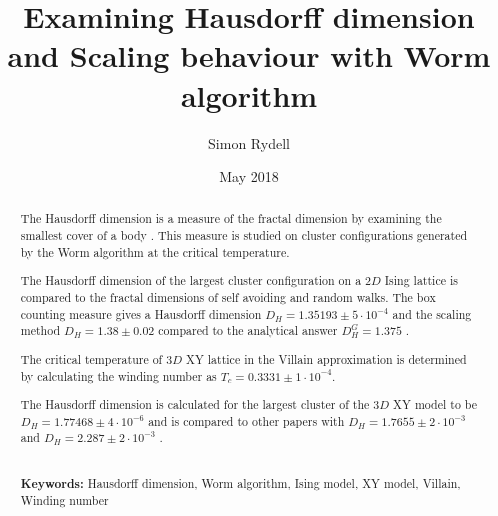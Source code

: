 \documentclass[nocoverpage,swedish,g5paper]{thesis}
\title{Examining Hausdorff dimension and Scaling behaviour with Worm algorithm}
\author{Simon Rydell}
\date{May 2018}
\begin{document}

\begin{abstract}

The Hausdorff dimension is a measure of the fractal dimension by examining the smallest cover of a body \cite{Heinonen:HausdorffDimMath}. This measure is studied on cluster configurations generated by the Worm algorithm at the critical temperature.

The Hausdorff dimension of the largest cluster configuration on a $2D$ Ising lattice is compared to the fractal dimensions of self avoiding and random walks. The box counting measure \cite{strogatz:dynamics_chaos} gives a Hausdorff dimension $D_H = 1.35193 \pm 5 \cdot 10^{-4}$ and the scaling method \cite{Hove:hausdorff_crit_fluctuations} $D_H = 1.38 \pm 0.02$ compared to the analytical answer $D_H^{G} = 1.375$ \cite{Duplantier:GeoHausdorff}.

The critical temperature of $3D$ XY lattice in the Villain approximation is determined by calculating the winding number as $T_c = 0.3331 \pm 1 \cdot 10^{-4}$.

The Hausdorff dimension is calculated for the largest cluster of the $3D$ XY model to be $D_H = 1.77468 \pm 4 \cdot 10^{-6}$ and is compared to other papers with $D_H = 1.7655 \pm 2 \cdot 10^{-3}$ \cite{Prokofev:comment_on_hove_hausdorff_crit_fluct} and $D_H = 2.287 \pm 2 \cdot 10^{-3}$ \cite{Hove:hausdorff_crit_fluctuations}.
\\ \noindent \strut \\
\textbf{Keywords:} Hausdorff dimension, Worm algorithm, Ising model, XY model, Villain, Winding number

\newpage




\end{abstract}
\end{document}
